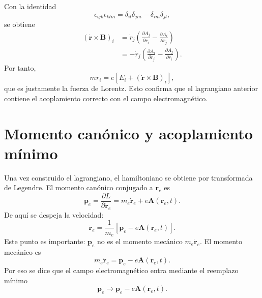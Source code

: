 \documentclass[11pt]{article}
\newcommand{\vb}[1]{\mathbf{#1}}
\begin{document}
Con la identidad
\begin{equation}
  \epsilon_{ijk}\epsilon_{klm}
  =
  \delta_{il}\delta_{jm}
  -
  \delta_{im}\delta_{jl},
\end{equation}
se obtiene
\begin{align}
  \left(\dot{\vb r}\times\vb B\right)_i
  &=
  \dot r_j
  \left(
    \frac{\partial A_j}{\partial r_i}
    -
    \frac{\partial A_i}{\partial r_j}
  \right)                                                                      \\
  &=
  -\dot r_j
  \left(
    \frac{\partial A_i}{\partial r_j}
    -
    \frac{\partial A_j}{\partial r_i}
  \right).
\end{align}
Por tanto,
\begin{equation}
  m\ddot r_i
  =
  e\left[E_i+\left(\dot{\vb r}\times\vb B\right)_i\right],
\end{equation}
que es justamente la fuerza de Lorentz. Esto confirma que el lagrangiano
anterior contiene el acoplamiento correcto con el campo electromagn\'etico.

\section{Momento can\'onico y acoplamiento m\'inimo}

Una vez construido el lagrangiano, el hamiltoniano se obtiene por transformada
de Legendre. El momento can\'onico conjugado a \(\vb r_e\) es
\begin{equation}
  \vb p_e
  =
  \frac{\partial L}{\partial\dot{\vb r}_e}
  =
  m_e\dot{\vb r}_e+e\vb A(\vb r_e,t).
\end{equation}
De aqu\'i se despeja la velocidad:
\begin{equation}
  \dot{\vb r}_e
  =
  \frac{1}{m_e}
  \left[
    \vb p_e-e\vb A(\vb r_e,t)
  \right].
\end{equation}
Este punto es importante: \(\vb p_e\) no es el momento mec\'anico
\(m_e\dot{\vb r}_e\). El momento mec\'anico es
\begin{equation}
  m_e\dot{\vb r}_e
  =
  \vb p_e-e\vb A(\vb r_e,t).
\end{equation}
Por eso se dice que el campo electromagn\'etico entra mediante el reemplazo
m\'inimo
\begin{equation}
  \vb p_e
  \longrightarrow
  \vb p_e-e\vb A(\vb r_e,t).
\end{equation}
\end{document}
